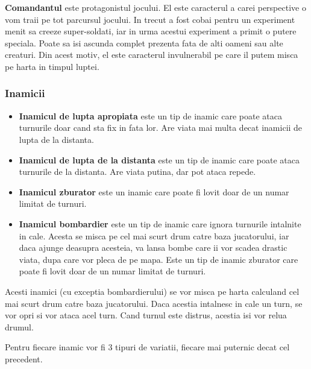 \documentclass[12pt, a4paper]{article}
\begin{document}
	\textbf{Comandantul} este protagonistul jocului. El este caracterul a carei perspective o vom traii pe tot parcursul jocului. In trecut a fost cobai pentru un experiment menit sa creeze super-soldati, iar in urma acestui experiment a primit o putere speciala. Poate sa isi ascunda complet prezenta fata de alti oameni sau alte creaturi. Din acest motiv, el este caracterul invulnerabil pe care il putem misca pe harta in timpul luptei.
	
	
	
	
	
	\subsubsection{Inamicii}
	\begin{itemize}
		\item \textbf{Inamicul de lupta apropiata} este un tip de inamic care poate ataca turnurile doar cand sta fix in fata lor. Are viata mai multa decat inamicii de lupta de la distanta.
		\item \textbf{Inamicul de lupta de la distanta} este un tip de inamic care poate ataca turnurile de la distanta. Are viata putina, dar pot ataca repede.
		\item \textbf{Inamicul zburator} este un inamic care poate fi lovit doar de un numar limitat de turnuri.
		\item \textbf{Inamicul bombardier} este un tip de inamic care ignora turnurile intalnite in cale. Acesta se misca pe cel mai scurt drum catre baza jucatorului, iar daca ajunge deasupra acesteia, va lansa bombe care ii vor scadea drastic viata, dupa care vor pleca de pe mapa. Este un tip de inamic zburator care poate fi lovit doar de un numar limitat de turnuri.
	\end{itemize}

	Acesti inamici (cu exceptia bombardierului) se vor misca pe harta calculand cel mai scurt drum catre baza jucatorului. Daca acestia intalnesc in cale un turn, se vor opri si vor ataca acel turn. Cand turnul este distrus, acestia isi vor relua drumul.
	\newline
	
	Pentru fiecare inamic vor fi 3 tipuri de variatii, fiecare mai puternic decat cel precedent.
	
	
	
	
	
\end{document}
